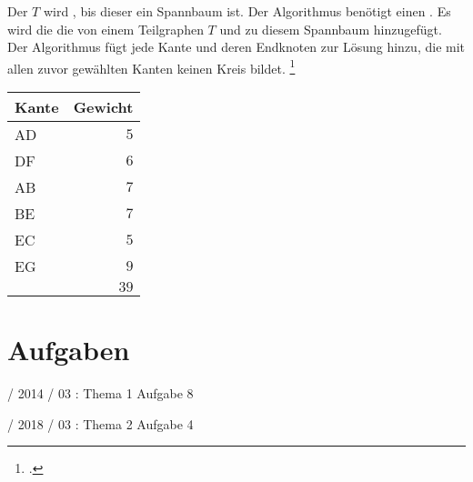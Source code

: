 \documentclass{lehramt-informatik}
\begin{document}
Der  $T$ wird , bis
dieser ein Spannbaum ist. Der Algorithmus benötigt einen
. Es wird die die  von
einem Teilgraphen $T$  und zu diesem
Spannbaum hinzugefügt. Der Algorithmus fügt jede Kante und deren
Endknoten zur Lösung hinzu, die mit allen zuvor gewählten Kanten keinen
Kreis bildet.
\footcite[Seite 32, (PDF 26)]{aud:fs:6}

\begin{minipage}{7cm}
\end{minipage}
\begin{minipage}{4cm}
\begin{center}
\begin{tabular}{|l|r|}
\hline
Kante & Gewicht\\\hline\hline
AD & $5$\\
DF & $6$\\
AB & $7$\\
BE & $7$\\
EC & $5$\\
EG & $9$\\\hline
   & $39$\\\hline
\end{tabular}
\end{center}
\end{minipage}


\chapter{Aufgaben}

 / 2014 / 03 : Thema 1 Aufgabe 8

%

 / 2018 / 03 : Thema 2 Aufgabe 4

%
\end{document}
